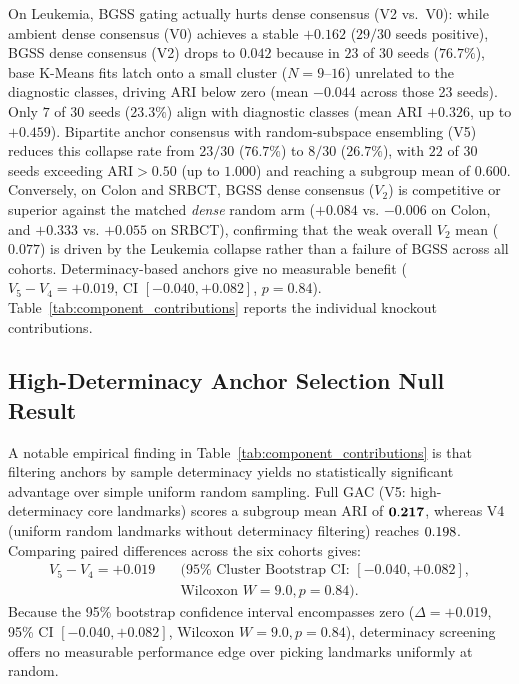 \documentclass[pdflatex,sn-mathphys-num]{sn-jnl}
\theoremstyle{thmstyleone}
\theoremstyle{thmstyletwo}
\theoremstyle{thmstylethree}
\begin{document}
On Leukemia, BGSS gating actually hurts dense consensus (V2 vs.\ V0): while ambient dense consensus (V0) achieves a stable $+0.162$ ($29/30$ seeds positive), BGSS dense consensus (V2) drops to $0.042$ because in $23$ of $30$ seeds ($76.7\%$), base K-Means fits latch onto a small cluster ($N = 9\text{--}16$) unrelated to the diagnostic classes, driving ARI below zero (mean $-0.044$ across those 23 seeds). Only $7$ of $30$ seeds ($23.3\%$) align with diagnostic classes (mean ARI $+0.326$, up to $+0.459$). Bipartite anchor consensus with random-subspace ensembling (V5) reduces this collapse rate from $23/30$ ($76.7\%$) to $8/30$ ($26.7\%$), with $22$ of $30$ seeds exceeding $\text{ARI} > 0.50$ (up to $1.000$) and reaching a subgroup mean of $0.600$. Conversely, on Colon and SRBCT, BGSS dense consensus ($V_2$) is competitive or superior against the matched \emph{dense} random arm ($+0.084$ vs. $-0.006$ on Colon, and $+0.333$ vs. $+0.055$ on SRBCT), confirming that the weak overall $V_2$ mean ($0.077$) is driven by the Leukemia collapse rather than a failure of BGSS across all cohorts. Determinacy-based anchors give no measurable benefit ($V_5 - V_4 = +0.019$, CI $[-0.040, +0.082]$, $p = 0.84$). Table~\ref{tab:component_contributions} reports the individual knockout contributions.



\subsection{High-Determinacy Anchor Selection Null Result}\label{sec:ablation_null}
A notable empirical finding in Table~\ref{tab:component_contributions} is that filtering anchors by sample determinacy yields no statistically significant advantage over simple uniform random sampling. Full GAC (V5: high-determinacy core landmarks) scores a subgroup mean ARI of $\mathbf{0.217}$, whereas V4 (uniform random landmarks without determinacy filtering) reaches $0.198$. Comparing paired differences across the six cohorts gives:
\begin{equation}
\begin{aligned}
 V_5 - V_4 = +0.019 \quad &(95\%\text{ Cluster Bootstrap CI: } [-0.040, +0.082], \\
  &\text{Wilcoxon } W=9.0, p=0.84).
\end{aligned}
\end{equation}
Because the 95\% bootstrap confidence interval encompasses zero ($\Delta = +0.019$, 95\% CI $[-0.040, +0.082]$, Wilcoxon $W=9.0, p=0.84$), determinacy screening offers no measurable performance edge over picking landmarks uniformly at random.
\end{document}
